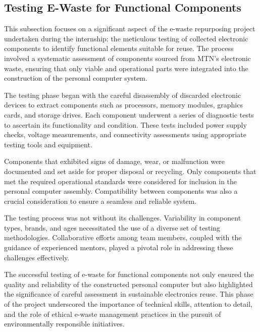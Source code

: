 \subsection{Testing E-Waste for Functional Components}

This subsection focuses on a significant aspect of the e-waste repurposing project undertaken during the internship: the meticulous testing of collected electronic components to identify functional elements suitable for reuse. The process involved a systematic assessment of components sourced from MTN's electronic waste, ensuring that only viable and operational parts were integrated into the construction of the personal computer system.

The testing phase began with the careful disassembly of discarded electronic devices to extract components such as processors, memory modules, graphics cards, and storage drives. Each component underwent a series of diagnostic tests to ascertain its functionality and condition. These tests included power supply checks, voltage measurements, and connectivity assessments using appropriate testing tools and equipment.

Components that exhibited signs of damage, wear, or malfunction were documented and set aside for proper disposal or recycling. Only components that met the required operational standards were considered for inclusion in the personal computer assembly. Compatibility between components was also a crucial consideration to ensure a seamless and reliable system.

The testing process was not without its challenges. Variability in component types, brands, and ages necessitated the use of a diverse set of testing methodologies. Collaborative efforts among team members, coupled with the guidance of experienced mentors, played a pivotal role in addressing these challenges effectively.

The successful testing of e-waste for functional components not only ensured the quality and reliability of the constructed personal computer but also highlighted the significance of careful assessment in sustainable electronics reuse. This phase of the project underscored the importance of technical skills, attention to detail, and the role of ethical e-waste management practices in the pursuit of environmentally responsible initiatives.
